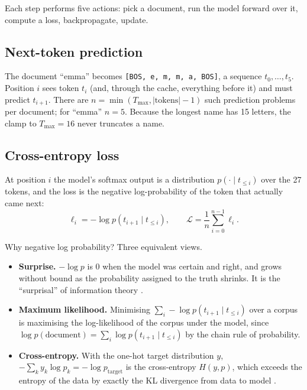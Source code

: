 \documentclass[11pt,letterpaper]{article}
\theoremstyle{remark}
\begin{document}
Each step performs five actions: pick a document, run the model forward over it, compute a loss, backpropagate, update.

\subsection{Next-token prediction}

The document ``emma'' becomes \texttt{[BOS, e, m, m, a, BOS]}, a sequence $t_0,\dots,t_5$. Position $i$ sees token $t_i$ (and, through the cache, everything before it) and must predict $t_{i+1}$. There are $n = \min(T_{\max}, |\text{tokens}|-1)$ such prediction problems per document; for ``emma'' $n=5$. Because the longest name has 15 letters, the clamp to $T_{\max}=16$ never truncates a name.

\subsection{Cross-entropy loss}
\label{sec:loss}

At position $i$ the model's softmax output is a distribution $p(\cdot\mid t_{\le i})$ over the 27 tokens, and the loss is the negative log-probability of the token that actually came next:
\begin{equation}
\ell_i = -\log p(t_{i+1}\mid t_{\le i}),\qquad \mathcal L = \frac1n\sum_{i=0}^{n-1}\ell_i.
\end{equation}

\begin{sidebar}{Why negative log probability?}
Three equivalent views.
\begin{itemize}[leftmargin=1.5em]
  \item \textbf{Surprise.} $-\log p$ is 0 when the model was certain and right, and grows without bound as the probability assigned to the truth shrinks. It is the ``surprisal'' of information theory \parencite{shannon1948mathematical,cover2006elements}.
  \item \textbf{Maximum likelihood.} Minimising $\sum_i -\log p(t_{i+1}\mid t_{\le i})$ over a corpus is maximising the log-likelihood of the corpus under the model, since $\log p(\text{document}) = \sum_i \log p(t_{i+1}\mid t_{\le i})$ by the chain rule of probability.
  \item \textbf{Cross-entropy.} With the one-hot target distribution $y$, $-\sum_k y_k\log p_k = -\log p_{\text{target}}$ is the cross-entropy $H(y,p)$, which exceeds the entropy of the data by exactly the KL divergence from data to model \parencite{goodfellow2016deep,bishop2006prml}.
\end{itemize}
\end{sidebar}
\end{document}
